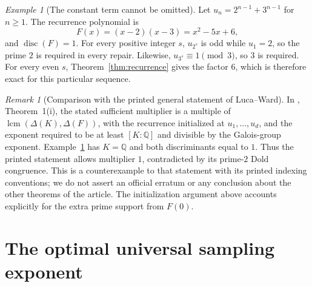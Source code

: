 \documentclass[11pt]{article}
\theoremstyle{remark}
\newtheorem{remark}[theorem]{Remark}
\newtheorem{example}[theorem]{Example}
\newcommand{\disc}{\operatorname{disc}}
\newcommand{\lcm}{\operatorname{lcm}}
\begin{document}
\begin{example}[The constant term cannot be omitted]\label{ex:initialization}
Let $u_n=2^{n-1}+3^{n-1}$ for $n\geq1$. The recurrence polynomial is
\[
 F(x)=(x-2)(x-3)=x^2-5x+6,
\]
and $\disc(F)=1$. For every positive integer $s$, $u_{2^s}$ is odd while $u_1=2$, so the prime $2$ is required in every repair. Likewise, $u_{3^s}\equiv1\pmod3$, so $3$ is required. For every even $s$, Theorem~\ref{thm:recurrence} gives the factor $6$, which is therefore exact for this particular sequence.
\end{example}

\begin{remark}[Comparison with the printed general statement of Luca--Ward]
In \cite{LW}, Theorem~1(i), the stated sufficient multiplier is a multiple of $\lcm(\Delta(K),\Delta(F))$, with the recurrence initialized at $u_1,\ldots,u_d$, and the exponent required to be at least $[K:\mathbb Q]$ and divisible by the Galois-group exponent. Example~\ref{ex:initialization} has $K=\mathbb Q$ and both discriminants equal to $1$. Thus the printed statement allows multiplier $1$, contradicted by its prime-$2$ Dold congruence. This is a counterexample to that statement with its printed indexing conventions; we do not assert an official erratum or any conclusion about the other theorems of the article. The initialization argument above accounts explicitly for the extra prime support from $F(0)$.
\end{remark}

\section{The optimal universal sampling exponent}
\end{document}
